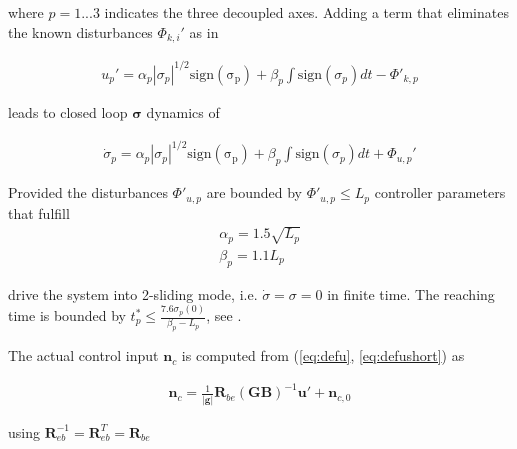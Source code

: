 \documentclass{ifacconf}
\providecommand{\mbf}[1]{\mathbf{#1}}
\newcommand{\idxAxis}{{\ensuremath{p}}}
\begin{document}
where $\idxAxis = 1...3$ indicates the three decoupled axes. Adding a term that eliminates the known disturbances ${\Phi}_{k,i}'$ as in \cite{galzi2006uav}

\begin{align}
u_\idxAxis' = \alpha_\idxAxis |\sigma_\idxAxis|^{1/2}\mathrm{sign(\sigma_\idxAxis)} + \beta_\idxAxis \int \mathrm{sign}(\sigma_\idxAxis) dt - {\Phi}'_{k,\idxAxis}
\end{align}

leads to closed loop $\mbf{\sigma}$ dynamics of

\begin{align}
\dot{\sigma}_\idxAxis = \alpha_\idxAxis |\sigma_\idxAxis|^{1/2}\mathrm{sign(\sigma_\idxAxis)} + \beta_\idxAxis \int \mathrm{sign}(\sigma_\idxAxis) dt + \Phi_{u,\idxAxis}'
\end{align}

Provided the disturbances $\Phi'_{u,\idxAxis}$ are bounded by $\Phi'_{u,\idxAxis} \leq L_\idxAxis$ controller parameters that fulfill
\begin{align}
\alpha_\idxAxis = 1.5 \sqrt{L_\idxAxis}
\label{eq:csmcgainconditionalpha}\\
\beta_\idxAxis = 1.1 L_\idxAxis
\label{eq:csmcgainconditionbeta}
\end{align}

 drive the system into 2-sliding mode, i.e. $\dot{\sigma} = \sigma = 0$ in finite time. The reaching time is bounded by $t_\idxAxis^* \leq \frac{7.6 \sigma_\idxAxis(0)}{\beta_\idxAxis - L_\idxAxis}$, see \cite{galzi2006uav}.

The actual control input $\mbf{n}_c$ is computed from (\ref{eq:defu}, \ref{eq:defushort}) as

\begin{align}
\mbf{n}_c = \frac{1}{|\mbf{g}|} \mbf{R}_{be}(\mbf{GB})^{-1} \mbf{u}' + \mbf{n}_{c,0}
\end{align}

using $\mbf{R}_{eb}^{-1} = \mbf{R}_{eb}^{T} = \mbf{R}_{be}$
\end{document}
